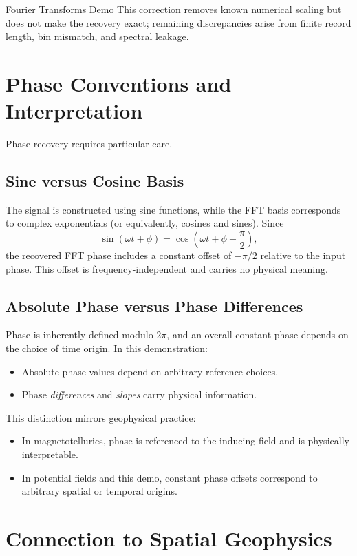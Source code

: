 \begin{activity}{Fourier Transforms Demo}
This correction removes known numerical scaling but does not make the recovery exact; remaining discrepancies arise from finite record length, bin mismatch, and spectral leakage.

\section*{Phase Conventions and Interpretation}

Phase recovery requires particular care.

\subsection*{Sine versus Cosine Basis}

The signal is constructed using sine functions, while the FFT basis corresponds to complex exponentials (or equivalently, cosines and sines).
Since
\begin{equation}
\sin(\omega t + \phi) = \cos\!\left(\omega t + \phi - \frac{\pi}{2}\right),
\end{equation}
the recovered FFT phase includes a constant offset of $-\pi/2$ relative to the input phase.
This offset is frequency-independent and carries no physical meaning.

\subsection*{Absolute Phase versus Phase Differences}

Phase is inherently defined modulo $2\pi$, and an overall constant phase depends on the choice of time origin.
In this demonstration:
\begin{itemize}
  \item Absolute phase values depend on arbitrary reference choices.
  \item Phase \emph{differences} and \emph{slopes} carry physical information.
\end{itemize}

This distinction mirrors geophysical practice:
\begin{itemize}
  \item In magnetotellurics, phase is referenced to the inducing field and is physically interpretable.
  \item In potential fields and this demo, constant phase offsets correspond to arbitrary spatial or temporal origins.
\end{itemize}

\section*{Connection to Spatial Geophysics}


\end{activity}
